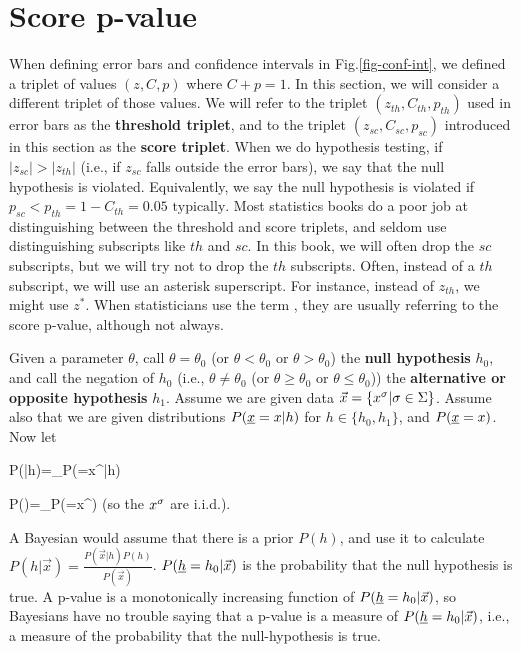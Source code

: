 \section{Score p-value}
\label{sec-score-p-value}
When defining error bars
and confidence intervals in
Fig.\ref{fig-conf-int},
we defined a triplet
of values $(z, C, p)$
where $C+p=1$.
In this section,
we will consider a different triplet
of those values.
We will refer to the triplet
$(z_{th}, C_{th}, p_{th})$
used in error bars as the {\bf threshold triplet}, and to
the triplet
$(z_{sc}, C_{sc}, p_{sc})$
introduced in this section as the
{\bf score triplet}.
When we do hypothesis testing,
if $|z_{sc}|> |z_{th}|$
(i.e., if $z_{sc}$
falls outside
the error bars),
we say that the null
hypothesis is violated.
Equivalently, we say the null
hypothesis is violated
if $p_{sc}<p_{th}=1-C_{th}=0.05 \text{ typically}$.
Most statistics
books do a poor job
at distinguishing between
the threshold and score
triplets, and
seldom use distinguishing
subscripts like $th$ and $sc$.
In this book,
we will often
drop the $sc$
subscripts, but we will
try not to drop the $th$ subscripts.
Often, instead of
a $th$
subscript, we will
use an asterisk superscript.
For instance, instead
of $z_{th}$,
we might use $z^*$.
W\label{key}hen statisticians
use the term
,
they are usually referring to
the score p-value,
although not always.



Given a parameter $\theta$, call
$\theta=\theta_0$ (or  $\theta<\theta_0$ or $\theta>\theta_0$) the
{\bf null hypothesis} $h_0$,
and call the negation of $h_0$ (i.e.,
$\theta\neq\theta_0$ (or  $\theta\geq\theta_0$ or $\theta\leq \theta_0$))
the {\bf alternative or
opposite hypothesis} $h_1$.
Assume we
are given data $\vec{x}=\{x^\sigma|\sigma\in \Sigma\}$. Assume
also that we are given
distributions $P(\rvx=x|h)$ for $h\in \{h_0, h_1\}$,
and $P(\rvx=x)$. Now let

\beq
P(|h)=\prod_\s P(\rvx=x^\s|h)
\eeq


\beq
P()=\prod_\s P(\rvx=x^\s)
\eeq
(so the $x^\sigma$ are i.i.d.).

A Bayesian would assume that there
is a prior $P(h)$, and use it to
calculate
$P(h|\vec{x})=\frac{P(\vec{x}|h) P(h)}{P(\vec{x})}$.
$P(\rvh= h_0|\vec{x})$
is the probability that the null hypothesis is true.
A p-value is a monotonically increasing function of
$P(\rvh= h_0|\vec{x})$,
so Bayesians have no trouble saying
that  {\color{red} a  p-value is
a measure of
$P(\rvh= h_0|\vec{x})$, i.e.,
a measure of the probability that
the null-hypothesis is true}.


